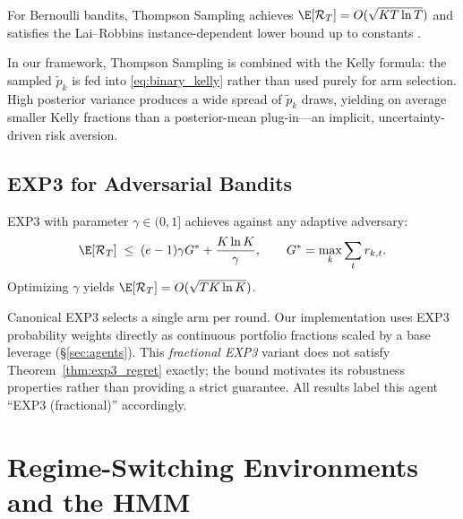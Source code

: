 \begin{theorem}
\label{thm:ts_regret}
For Bernoulli bandits, Thompson Sampling achieves
$\E[\mathcal{R}_T] = O(\sqrt{KT\ln T})$
and satisfies the Lai--Robbins instance-dependent lower bound up to constants \citep{lai1985asymptotically}.
\end{theorem}

In our framework, Thompson Sampling is combined with the Kelly formula: the
sampled $\tilde p_k$ is fed into \eqref{eq:binary_kelly} rather than used
purely for arm selection.  High posterior variance produces a wide spread of
$\tilde p_k$ draws, yielding on average smaller Kelly fractions than a
posterior-mean plug-in---an implicit, uncertainty-driven risk aversion.

\subsection{EXP3 for Adversarial Bandits}

\begin{theorem}
\label{thm:exp3_regret}
EXP3 with parameter $\gamma\in(0,1]$ achieves against any adaptive adversary:
\[
    \E[\mathcal{R}_T] \;\leq\;
    (e-1)\gamma G^* + \frac{K\ln K}{\gamma},
    \qquad
    G^* = \max_k\sum_t r_{k,t}.
\]
Optimizing $\gamma$ yields $\E[\mathcal{R}_T] = O(\sqrt{TK\ln K})$.
\end{theorem}

\begin{remark}
\label{rem:exp3_variant}
Canonical EXP3 selects a single arm per round.  Our implementation uses EXP3
probability weights directly as continuous portfolio fractions scaled by a base
leverage (\S\ref{sec:agents}).  This \emph{fractional EXP3} variant does not
satisfy Theorem~\ref{thm:exp3_regret} exactly; the bound motivates its
robustness properties rather than providing a strict guarantee.  All results
label this agent ``EXP3 (fractional)'' accordingly.
\end{remark}

\section{Regime-Switching Environments and the HMM}

